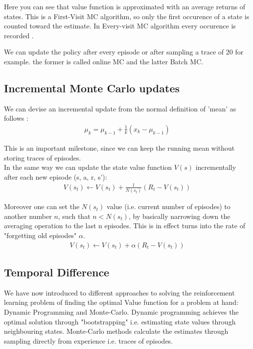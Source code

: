 Here you can see that value function is approximated with an average returns of states. This is a First-Visit MC algorithm, so only the first occurence of a state is counted toward the estimate. In Every-visit MC algorithm every occurence is recorded \cite{lecture_mfl}.

We can update the policy after every episode or after
sampling a trace of 20 for example. the former is called online MC and the latter Batch MC.

\subsection{Incremental Monte Carlo updates}
We can devise an incremental update from the normal definition of 'mean' as follows \cite{lecture_mfl} :
\begin{align}
    \mu_k = \mu_{k - 1} + \frac{1}{k} (x_k - \mu_{k - 1})
\end{align}

This is an important milestone, since we can keep the running mean without storing traces of episodes. \\

In the same way we can update the state value function $V(s)$ incrementally after each new episode (s, a, r, s'):
\begin{align}
    V(s_t) \longleftarrow V(s_t) + \frac{1}{N(s_t)}(R_t - V(s_t))
\end{align}

Moreover one can set the $N(s_t)$ value (i.e. current number of episodes) to another number $n$, such that $n < N(s_t)$, by basically narrowing down the averaging operation to the last n episodes. This is in effect turns into the rate of "forgetting old episodes" \cite{lecture_mfl} $\alpha$.
\begin{align}
    V(s_t) \longleftarrow V(s_t) + \alpha (R_t - V(s_t)) \label{eq:mc_increment}
\end{align}

\subsection{Temporal Difference}
We have now introduced to different approaches to solving 
the reinforcement learning problem of finding the optimal 
Value function for a problem at hand: Dynamic Programming and 
Monte-Carlo. Dynamic programming achieves the optimal solution
through "bootstrapping" i.e. estimating state values through
neighbouring states. Monte-Carlo methods calculate the estimates through sampling directly from experience i.e. traces of episodes. \\

